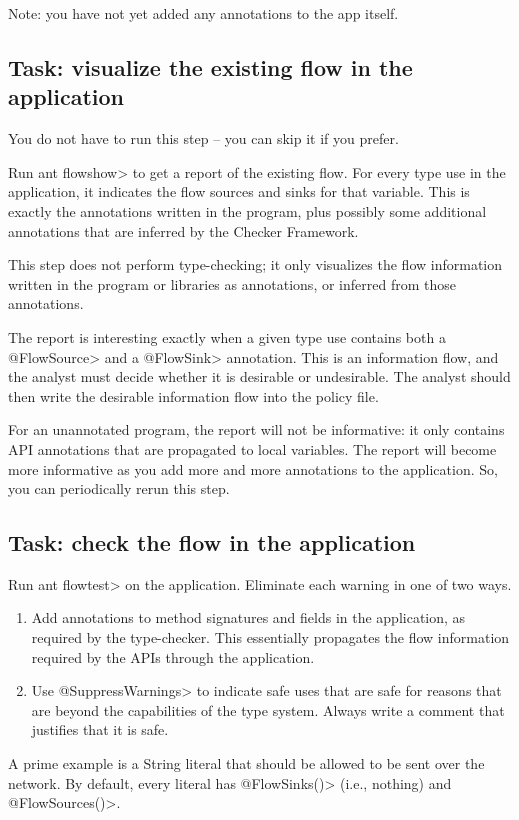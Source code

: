 Note: you have not yet added any annotations to the app itself.


\subsection{Task: visualize the existing flow in the application}

You do not have to run this step -- you can skip it if you
prefer.

Run \<ant flowshow> to get a report of the
existing flow.
For every type use in the application, it indicates the flow sources
and sinks for that variable. This is exactly the annotations written
in the program, plus possibly some additional annotations that are
inferred by the Checker Framework.


This step does not perform type-checking; it only visualizes the flow
information written in the program or libraries as annotations, or
inferred from those annotations.

The report is interesting exactly when a given type use contains both
a \<@FlowSource> and a \<@FlowSink> annotation. This is an information flow,
and the analyst must decide whether it is desirable or undesirable.  The analyst
should then write the desirable information flow into the policy file.

For an unannotated program, the report will not be informative: it
only contains API annotations that are propagated to local
variables. The report will become more informative as you add more and
more annotations to the application. So, you can periodically rerun
this step. 


\subsection{Task: check the flow in the application}

Run \<ant flowtest> on the application.
Eliminate each warning in one of two ways.
\begin{enumerate}
\item Add annotations to method signatures and fields in the application, as
required by the type-checker. This essentially propagates the flow
information required by the APIs through the application.

\item Use \<@SuppressWarnings> to indicate safe uses that are safe for reasons
that are beyond the capabilities of the type system. Always write a
comment that justifies that it is safe.
\end{enumerate}
A prime example is a String literal that should be allowed to be sent
over the network. By default, every literal has \<@FlowSinks()>
(i.e., nothing) and \<@FlowSources()>.

